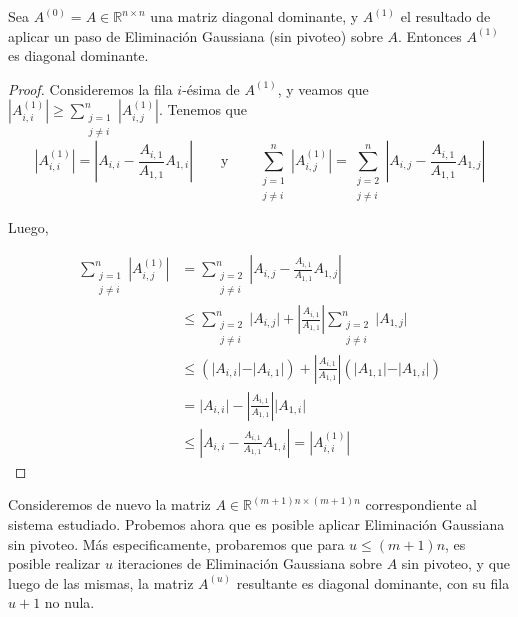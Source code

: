       \begin{lema}
        \label{lema:EG conserva diagonal dominante}
        Sea $A^{(0)} = A \in \mathbb{R}^{n \times n}$ una matriz diagonal dominante, y $A^{(1)}$ el resultado de aplicar un paso de Eliminación Gaussiana (sin pivoteo) sobre $A$. Entonces $A^{(1)}$ es diagonal dominante.
      \end{lema}
      \begin{proof}
        Consideremos la fila $i$-ésima de $A^{(1)}$, y veamos que $\left \vert A^{(1)}_{i,i} \right \vert \geq \sum_{\substack{j = 1 \\ j \neq i}}^n \left \vert A^{(1)}_{i,j} \right \vert$. Tenemos que
        \[ \left \vert A^{(1)}_{i,i} \right \vert = \left \vert A_{i,i} - \frac{A_{i,1}}{A_{1,1}} A_{1,i} \right \vert
          \qquad \text{y} \qquad
        \sum_{\substack{j = 1 \\ j \neq i}}^n \left \vert A^{(1)}_{i,j} \right \vert
          = \sum_{\substack{j = 2 \\ j \neq i}}^n \left \vert A_{i,j} - \frac{A_{i,1}}{A_{1,1}} A_{1,j} \right \vert \]

        Luego,

        \[ \begin{split}
          \sum_{\substack{j = 1 \\ j \neq i}}^n \left \vert A^{(1)}_{i,j} \right \vert
          &= \sum_{\substack{j = 2 \\ j \neq i}}^n \left \vert A_{i,j} - \frac{A_{i,1}}{A_{1,1}} A_{1,j} \right \vert \\
          &\leq \sum_{\substack{j = 2 \\ j \neq i}}^n \vert A_{i,j} \vert + \left \vert \frac{A_{i,1}}{A_{1,1}} \right \vert \sum_{\substack{j = 2 \\ j \neq i}}^n \vert A_{1,j} \vert \\
          &\leq \left( \vert A_{i,i} \vert - \vert A_{i,1} \vert \right) + \left \vert \frac{A_{i,1}}{A_{1,1}} \right \vert \left( \vert A_{1,1} \vert - \vert A_{1,i} \vert \right) \\
          &= \vert A_{i,i} \vert - \left \vert \frac{A_{i,1}}{A_{1,1}} \right \vert \vert A_{1,i} \vert \\
          &\leq \left \vert A_{i,i} -  \frac{A_{i,1}}{A_{1,1}} A_{1,i} \right \vert = \left \vert A^{(1)}_{i,i} \right \vert
        \end{split} \]
      \end{proof}

      Consideremos de nuevo la matriz $A \in \mathbb{R}^{(m+1)n \times (m+1)n}$ correspondiente al sistema estudiado. Probemos ahora que es posible aplicar Eliminación Gaussiana sin pivoteo. Más especificamente, probaremos que para $u \leq (m+1)n$, es posible realizar $u$ iteraciones de Eliminación Gaussiana sobre $A$ sin pivoteo, y que luego de las mismas, la matriz $A^{(u)}$ resultante es diagonal dominante, con su fila $u + 1$ no nula.

